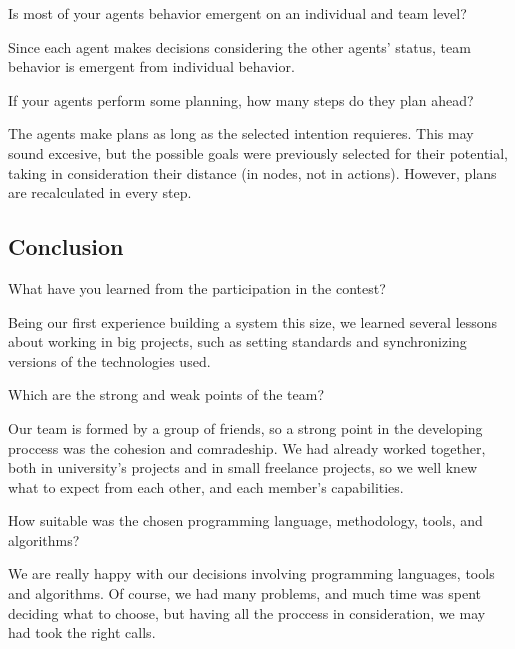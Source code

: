 \begin{question}
Is most of your agents behavior emergent on an individual and team
level?
\end{question}
Since each agent makes decisions considering the other agents' status,
team behavior is emergent from individual behavior.

\begin{question}
If your agents perform some planning, how many steps do they plan ahead?
\end{question}

The agents make plans as long as the selected intention requieres. This may
sound excesive, but the possible goals were previously selected for their
potential, taking in consideration their distance (in nodes, not in actions).
However, plans are recalculated in every step.

\subsection{Conclusion}
\setcounter{question}{0}
\begin{question}
What have you learned from the participation in the contest?
\end{question}

Being our first experience building a system this size, we learned several 
lessons about working in big projects, such as setting standards and 
synchronizing versions of the technologies used.

\begin{question}
Which are the strong and weak points of the team?
\end{question}

    Our team is formed by a group of friends, so a strong point in the
    developing proccess was the cohesion and comradeship. We had
    already worked together, both in university's projects and in
    small freelance projects, so we well knew what to expect from each other,
    and each member's capabilities.

\begin{question}  
How suitable was the chosen programming language, methodology, tools, and
algorithms?
\end{question}

    We are really happy with our decisions involving programming languages,
    tools and algorithms. Of course, we had many problems, and much time was
    spent deciding what to choose, but having all the proccess in
    consideration, we may had took the right calls.

